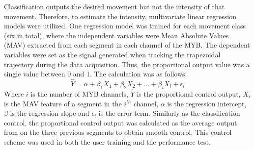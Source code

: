 Classification outputs the desired movement but not the intensity of that movement. Therefore, to estimate the intensity, multivariate linear regression models were utilized. One regression model was trained for each movement class (six in total), where the independent variables were Mean Absolute Values (MAV) extracted from each segment in each channel of the MYB. The dependent variables were set as the signal generated when tracking the trapezoidal trajectory during the data acquisition. Thus, the proportional output value was a single value between 0 and 1. The calculation was as follows: 
\vspace{-0.2cm}
\begin{equation} \label{eq:P:multiLinearRegression}
\hat{Y} = \alpha + \beta_1 X_{1} + \beta_2 X_{2} + ... + \beta_i X_{i} + \epsilon_i
\end{equation} 
\vspace{-0.05cm}
Where $i$ is the number of MYB channels, $\hat{Y}$ is the proportional control output, $X_{i}$ is the MAV feature of a segment in the $i^{th}$ channel, $\alpha$ is the regression intercept, $\beta$ is the regression slope and $\epsilon_{i}$ is the error term. Similarly as the classification control, the proportional control output was calculated as the average output from on the three previous segments to obtain smooth control. This control scheme was used in both the user training and the performance test.